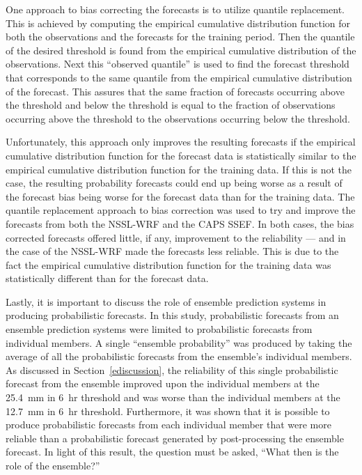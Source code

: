 One approach to bias correcting the forecasts is to utilize quantile replacement.
This is achieved by computing the empirical cumulative distribution function for both the observations and the forecasts for the training period.
Then the quantile of the desired threshold is found from the empirical cumulative distribution of the observations.
Next this ``observed quantile'' is used to find the forecast threshold that corresponds to the same quantile from the empirical cumulative distribution of the forecast.
This assures that the same fraction of forecasts occurring above the threshold and below the threshold is equal to the fraction of observations occurring above the threshold to the observations occurring below the threshold.


Unfortunately, this approach only improves the resulting forecasts if the empirical cumulative distribution function for the forecast data is statistically similar to the empirical cumulative distribution function for the training data.
If this is not the case, the resulting probability forecasts could end up being worse as a result of the forecast bias being worse for the forecast data than for the training data.
The quantile replacement approach to bias correction was used to try and improve the forecasts from both the NSSL-WRF and the CAPS SSEF.
In both cases, the bias corrected forecasts offered little, if any, improvement to the reliability --- and in the case of the NSSL-WRF made the forecasts less reliable.
This is due to the fact the empirical cumulative distribution function for the training data was statistically different than for the forecast data.


Lastly, it is important to discuss the role of ensemble prediction systems in producing probabilistic forecasts.
In this study, probabilistic forecasts from an ensemble prediction systems were limited to probabilistic forecasts from individual members.
A single ``ensemble probability'' was produced by taking the average of all the probabilistic forecasts from the ensemble's individual members.
As discussed in \mbox{Section \ref{ediscussion}}, the reliability of this single probabilistic forecast from the ensemble improved upon the individual members at the \mbox{25.4 mm} in \mbox{6 hr} threshold and was worse than the individual members at the \mbox{12.7 mm} in \mbox{6 hr} threshold.
Furthermore, it was shown that it is possible to produce probabilistic forecasts from each individual member that were more reliable than a probabilistic forecast generated by post-processing the ensemble forecast.
In light of this result, the question must be asked, ``What then is the role of the ensemble?''


